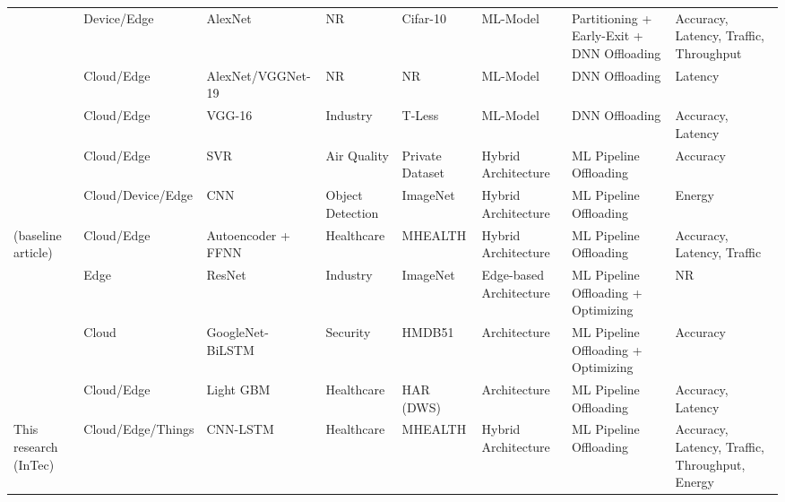\begin{landscape}
\begin{longtable}{@{}p{1.5cm}p{3.5cm}p{2.5cm}p{2.5cm}p{2.5cm}p{3cm}p{5cm}p{2.2cm}@{}}
			\cite{c14} & Device/Edge & AlexNet & NR & Cifar-10 & ML-Model & Partitioning + Early-Exit + DNN Offloading & Accuracy, Latency, Traffic, Throughput \\
			\cite{c29} & Cloud/Edge & AlexNet/VGGNet-19 & NR & NR & ML-Model & DNN Offloading & Latency \\
			\cite{c37} & Cloud/Edge & VGG-16 & Industry & T-Less & ML-Model & DNN Offloading & Accuracy, Latency \\
			\cite{c32} & Cloud/Edge & SVR & Air Quality & Private Dataset & Hybrid Architecture & ML Pipeline Offloading & Accuracy \\
			\cite{c31} & Cloud/Device/Edge & CNN & Object Detection & ImageNet & Hybrid Architecture & ML Pipeline Offloading & Energy \\
			\cite{c15}  (baseline article) & Cloud/Edge & Autoencoder + FFNN & Healthcare & MHEALTH & Hybrid Architecture & ML Pipeline Offloading & Accuracy, Latency, Traffic \\
			\cite{c33} & Edge & ResNet & Industry & ImageNet & Edge-based Architecture & ML Pipeline Offloading + Optimizing & NR \\
			\cite{c16} & Cloud & GoogleNet-BiLSTM & Security & HMDB51 & Architecture & ML Pipeline Offloading + Optimizing & Accuracy \\
			\cite{c17} & Cloud/Edge & Light GBM & Healthcare & HAR (DWS) & Architecture & ML Pipeline Offloading & Accuracy, Latency \\
			This research (InTec) & Cloud/Edge/Things & CNN-LSTM & Healthcare & MHEALTH & Hybrid Architecture & ML Pipeline Offloading & Accuracy, Latency, Traffic, Throughput, Energy \\
		\end{longtable}
		

\end{landscape}

